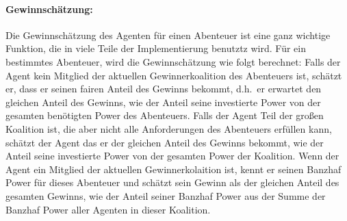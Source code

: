 \documentclass[fleqn,10pt]{SelfArx} %
\begin{document}
\paragraph{Gewinnschätzung:}
Die Gewinnschätzung des Agenten für einen Abenteuer ist eine ganz wichtige Funktion, die in viele Teile der Implementierung benutztz wird.
Für ein bestimmtes Abenteuer, wird die Gewinnschätzung wie folgt berechnet: Falls der Agent kein Mitglied der aktuellen Gewinnerkoalition des Abenteuers ist, schätzt er, dass er seinen fairen Anteil des Gewinns bekommt, d.h.\ er erwartet den gleichen Anteil des Gewinns, wie der Anteil seine investierte Power von der gesamten benötigten Power des Abenteuers. Falls der Agent Teil der großen Koalition ist, die aber nicht alle Anforderungen des Abenteuers erfüllen kann, schätzt der Agent das er der gleichen Anteil des Gewinns bekommt, wie der Anteil seine investierte Power von der gesamten Power der Koalition. Wenn der Agent ein Mitglied der aktuellen Gewinnerkolaition ist, kennt er seinen Banzhaf Power für dieses Abenteuer und schätzt sein Gewinn als der gleichen Anteil des gesamten Gewinns, wie der Anteil seiner Banzhaf Power aus der Summe der Banzhaf Power aller Agenten in dieser Koalition.
\end{document}
